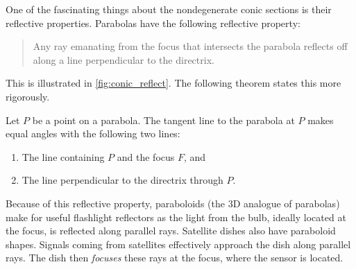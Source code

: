 {One of the fascinating things about the nondegenerate conic sections is their reflective properties. Parabolas have the following reflective property:

\begin{quote}
	Any ray emanating from the focus that intersects the parabola reflects off along a line perpendicular to the directrix.
\end{quote}

This is illustrated in \autoref{fig:conic_reflect}. The following theorem states this more rigorously.

	
\begin{theorem}\label{thm:parabola_reflect}
Let $P$ be a point on a parabola. The tangent line to the parabola at $P$ makes equal angles with the following two lines:
\begin{enumerate}
	\item	The line containing $P$ and the focus $F$, and
	\item	The line perpendicular to the directrix through $P$.
\end{enumerate}
\end{theorem}


Because of this reflective property, paraboloids (the 3D analogue of parabolas) make for useful flashlight reflectors as the light from the bulb, ideally located at the focus, is reflected along parallel rays. Satellite dishes also have paraboloid shapes. Signals coming from satellites effectively approach the dish along parallel rays. The dish then \textit{focuses} these rays at the focus, where the sensor is located.
}

